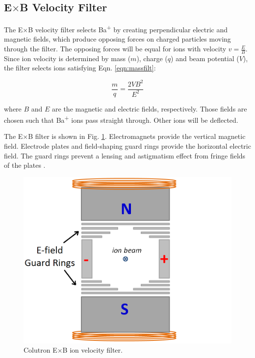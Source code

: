 \subsection{E$\times$B Velocity Filter}

The E$\times$B velocity filter selects Ba\textsuperscript{+} by creating perpendicular electric and magnetic fields, which produce opposing forces on charged particles moving through the filter.  The opposing forces will be equal for ions with velocity $v = \frac{E}{B}$.  Since ion velocity is determined by mass ($m$), charge ($q$) and beam potential ($V$), the filter selects ions satisfying Eqn. \ref{eqn:massfilt}:

\begin{equation}
\frac{m}{q} = \frac{2 V B^{2}}{E^{2}}
\label{eqn:massfilt}
\end{equation}

\noindent
where $B$ and $E$ are the magnetic and electric fields, respectively.  Those fields are chosen such that Ba\textsuperscript{+} ions pass straight through.  Other ions will be deflected.  

The E$\times$B filter is shown in Fig. \ref{fig:exb}.  Electromagnets provide the vertical magnetic field.  Electrode plates and field-shaping guard rings provide the horizontal electric field.  The guard rings prevent a lensing and astigmatism effect from fringe fields of the plates \cite{Colutron}.

\begin{figure}[h]
        \centering
                \includegraphics[width=.7\textwidth]{figures/ExB.png}
                \caption{Colutron E$\times$B ion velocity filter.}
\label{fig:exb}
\end{figure}


